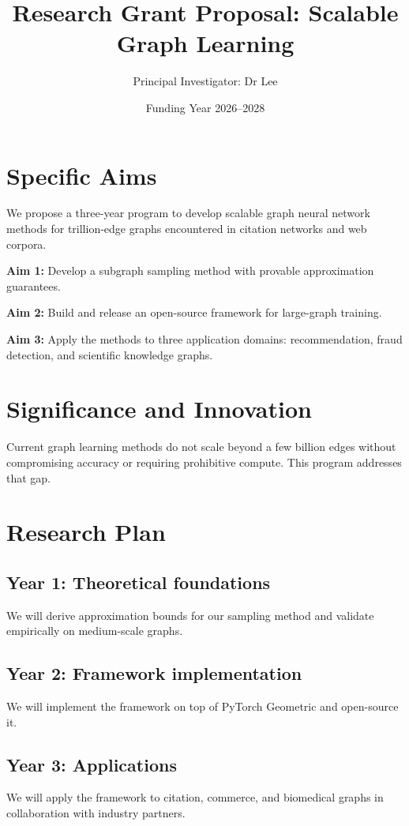 \documentclass[11pt]{article}
\title{Research Grant Proposal: Scalable Graph Learning}
\author{Principal Investigator: Dr Lee}
\date{Funding Year 2026--2028}
\begin{document}
\maketitle

\section{Specific Aims}
We propose a three-year program to develop scalable graph neural network methods for trillion-edge graphs encountered in citation networks and web corpora.

\textbf{Aim 1:} Develop a subgraph sampling method with provable approximation guarantees.

\textbf{Aim 2:} Build and release an open-source framework for large-graph training.

\textbf{Aim 3:} Apply the methods to three application domains: recommendation, fraud detection, and scientific knowledge graphs.

\section{Significance and Innovation}
Current graph learning methods do not scale beyond a few billion edges without compromising accuracy or requiring prohibitive compute. This program addresses that gap.

\section{Research Plan}

\subsection{Year 1: Theoretical foundations}
We will derive approximation bounds for our sampling method and validate empirically on medium-scale graphs.

\subsection{Year 2: Framework implementation}
We will implement the framework on top of PyTorch Geometric and open-source it.

\subsection{Year 3: Applications}
We will apply the framework to citation, commerce, and biomedical graphs in collaboration with industry partners.
\end{document}
